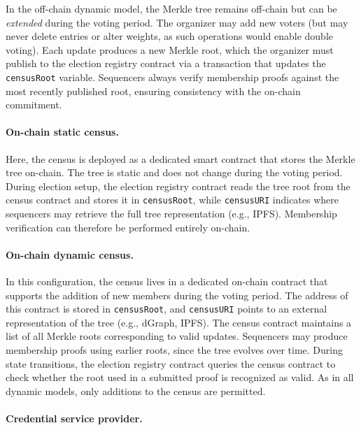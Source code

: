 In the off-chain dynamic model, the Merkle tree remains off-chain but can be \emph{extended} 
during the voting period. The organizer may add new voters (but may never delete entries 
or alter weights, as such operations would enable double voting). Each update produces a 
new Merkle root, which the organizer must publish to the election registry contract via a 
transaction that updates the \texttt{censusRoot} variable. Sequencers always verify 
membership proofs against the most recently published root, ensuring consistency with the 
on-chain commitment.

\paragraph{On-chain static census.}

Here, the census is deployed as a dedicated smart contract that stores the Merkle tree 
on-chain. The tree is static and does not change during the voting period. During election 
setup, the election registry contract reads the tree root from the census contract and 
stores it in \texttt{censusRoot}, while \texttt{censusURI} indicates where sequencers may 
retrieve the full tree representation (e.g., IPFS). Membership verification can therefore 
be performed entirely on-chain.

\paragraph{On-chain dynamic census.}

In this configuration, the census lives in a dedicated on-chain contract that supports the
addition of new members during the voting period. The address of this contract is stored in 
\texttt{censusRoot}, and \texttt{censusURI} points to an external representation of the tree 
(e.g., dGraph, IPFS). The census contract maintains a list of all Merkle roots corresponding 
to valid updates. Sequencers may produce membership proofs using earlier roots, since the 
tree evolves over time. During state transitions, the election registry contract queries the 
census contract to check whether the root used in a submitted proof is recognized as valid. 
As in all dynamic models, only additions to the census are permitted.

\paragraph{Credential service provider.}

